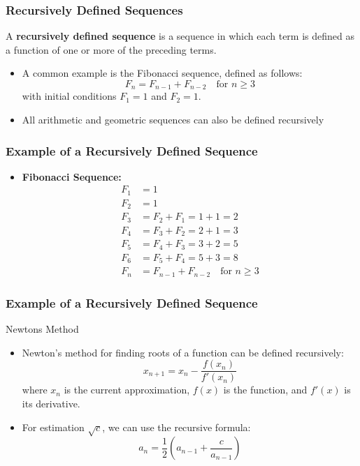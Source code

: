 \begin{frame}
\frametitle{Recursively Defined Sequences}
\begin{definition}
A \textbf{recursively defined sequence} is a sequence in which each term is defined as a function of one or more of the preceding terms.
\end{definition}
\begin{itemize}
    \item A common example is the Fibonacci sequence, defined as follows:
    \[
        F_n = F_{n-1} + F_{n-2} \quad \text{for } n \geq 3
    \]
    with initial conditions \(F_1 = 1\) and \(F_2 = 1\).
    \item All arithmetic and geometric sequences can also be defined recursively
\end{itemize}
\end{frame}

\begin{frame}
    \frametitle{Example of a Recursively Defined Sequence}
    \begin{itemize}
        \item \textbf{Fibonacci Sequence:}
        \begin{align*}
            F_1 &= 1 \\
            F_2 &= 1 \\
            F_3 &= F_2 + F_1 = 1 + 1 = 2 \\
            F_4 &= F_3 + F_2 = 2 + 1 = 3 \\
            F_5 &= F_4 + F_3 = 3 + 2 = 5 \\
            F_6 &= F_5 + F_4 = 5 + 3 = 8 \\
            F_n &= F_{n-1} + F_{n-2} \quad \text{for } n \geq 3
        \end{align*}
    \end{itemize}
\end{frame}

\begin{frame}
\frametitle{Example of a Recursively Defined Sequence}
\begin{block}{Newtons Method}
    \begin{itemize}
        \item Newton's method for finding roots of a function can be defined recursively:
        \[
            x_{n+1} = x_n - \frac{f(x_n)}{f'(x_n)}
        \]
        where \(x_n\) is the current approximation, \(f(x)\) is the function, and \(f'(x)\) is its derivative.
        \item For estimation \(\sqrt{c}\), we can use the recursive formula:
        \[
            a_{n} = \frac{1}{2}(a_{n-1} + \frac{c}{a_{n-1}})
        \]
    \end{itemize}
\end{block}
\end{frame}

